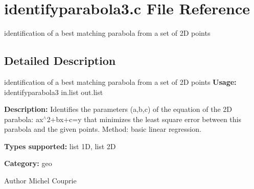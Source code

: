 \section{identifyparabola3.c File Reference}
\label{identifyparabola3_8c}


identification of a best matching parabola from a set of 2D points  




\subsection{Detailed Description}
identification of a best matching parabola from a set of 2D points {\bfseries Usage:} identifyparabola3 in.list out.list

{\bfseries Description:} Identifies the parameters (a,b,c) of the equation of the 2D parabola: ax$^\wedge$2+bx+c=y that minimizes the least square error between this parabola and the given points. Method: basic linear regression.

{\bfseries Types supported:} list 1D, list 2D

{\bfseries Category:} geo

\begin{DoxyAuthor}{Author}
Michel Couprie 
\end{DoxyAuthor}
